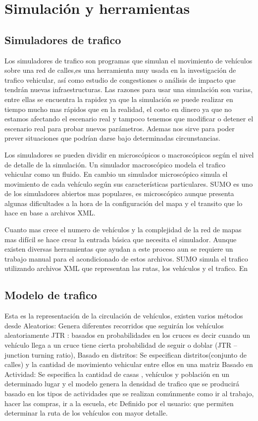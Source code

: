 \section{Simulación y herramientas}

\subsection{Simuladores de trafico}
Los simuladores de trafico son programas que simulan el movimiento de vehículos sobre una red de calles,es una herramienta muy usada en la investigación de trafico vehicular, así como estudio de congestiones o análisis de impacto que tendrán nuevas infraestructuras.  Las razones para usar una simulación son varias, entre ellas se encuentra  la rapidez  ya que la simulación se puede realizar en tiempo mucho mas rápidos que en la realidad, el costo en dinero ya que no estamos afectando el escenario real  y tampoco tenemos que modificar o detener el escenario real para probar nuevos parámetros. Ademas nos sirve para poder prever situaciones que podrían darse bajo determinadas circunstancias.

Los simuladores se pueden dividir en microscópicos o macroscópicos según el nivel de detalle de la simulación. Un simulador macroscópico modela  el trafico vehicular como un fluido. En cambio un simulador microscópico simula el movimiento de cada vehículo según sus características particulares.
SUMO es uno de los simuladores abiertos mas populares,  es microscópico aunque presenta algunas dificultades a la hora de la configuración del mapa y el transito que lo hace en base a archivos XML.

Cuanto mas crece el numero de vehículos y la complejidad de la red de mapas mas difícil se hace crear la entrada básica que necesita el simulador. Aunque existen diversas herramientas que ayudan a este proceso aun se requiere un trabajo manual para el acondicionado de estos archivos.
SUMO simula el trafico utilizando archivos XML que representan las rutas, los vehículos y el trafico. En 

\subsection{Modelo de trafico }
Esta es la representación de la circulación de vehículos, existen varios métodos desde 
Aleatorios: Genera diferentes recorridos que seguirán los vehículos aleatoriamente
JTR : basados en probabilidades en los cruces  es decir cuando un vehículo llega a un cruce tiene cierta probabilidad de seguir o doblar (JTR – junction turning ratio), 
Basado en distritos:  Se especifican distritos(conjunto de calles) y  la cantidad de movimiento vehicular entre ellos en una  matriz
Basado en Actividad: Se especifica la cantidad de casas , vehículos y población en un determinado lugar y el modelo genera la densidad de trafico que se producirá basado en los tipos de actividades que se realizan comúnmente como ir al trabajo, hacer las compras, ir a la escuela,  etc
Definido por el usuario: que permiten determinar la ruta de los vehículos con mayor detalle.

